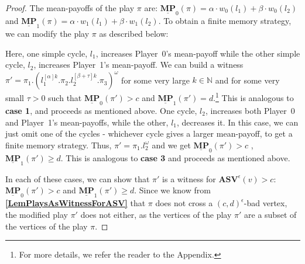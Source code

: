 \begin{proof}
\noindent The mean-payoffs of the play $\pi$ are: $\underline{\mathbf{MP}}_0(\pi) = \alpha \cdot w_0(l_1) + \beta \cdot w_0(l_2)$ and $\underline{\mathbf{MP}}_1(\pi) = \alpha \cdot w_1(l_1) + \beta \cdot w_1(l_2)$. To obtain a finite memory strategy, we can modify the play $\pi$ as described below:
\begin{caseof}
    Here, one simple cycle, $l_1$, increases Player~0's mean-payoff while the other simple cycle, $l_2$, increases Player~1's mean-payoff. We can build a witness $\pi' = \pi_1.(l_1^{[\alpha]k}.\pi_2.l_2^{[\beta+\tau]k}.\pi_3)^{\omega}$ for some very large $k \in \mathbb{N}$ and for some very small $\tau > 0$ such that $\underline{\mathbf{MP}}_0(\pi') > c$ and $\underline{\mathbf{MP}}_1(\pi') = d$.\footnote{For more details, we refer the reader to the Appendix.}
    This is analogous to \textbf{case 1}, and proceeds as mentioned above.
    One cycle, $l_2$, increases both Player~0 and Player~1's mean-payoffs, while the other, $l_1$, decreases it. In this case, we can just omit one of the cycles - whichever cycle gives a larger mean-payoff, to get a finite memory strategy. Thus, $\pi' = \pi_1.l_2^{\omega}$ and we get $\underline{\mathbf{MP}}_0(\pi') > c$ , $\underline{\mathbf{MP}}_1(\pi') \geqslant d$.
    This is analogous to \textbf{case 3} and proceeds as mentioned above.
\end{caseof}
In each of these cases, we can show that $\pi'$ is a witness for $\mathbf{ASV}^{\epsilon}(v) > c$: $\underline{\mathbf{MP}}_0(\pi') > c$ and $\underline{\mathbf{MP}}_1(\pi') \geqslant d$.
Since we know from \textbf{\cref{LemPlaysAsWitnessForASV}} that $\pi$ does not cross a $(c,d)^{\epsilon}$-bad vertex, the modified play $\pi'$ does not either, as the vertices of the play $\pi'$ are a subset of the vertices of the play $\pi$. 


\end{proof}
